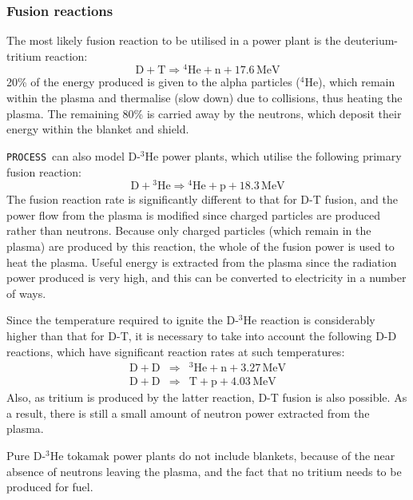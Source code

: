 \documentclass[11pt,a4paper]{report}
\newcommand{\process}{\mbox{\texttt{PROCESS}}}
\begin{document}
\subsubsection{Fusion reactions}
\label{sec:fusion_reactions}

The most likely fusion reaction to be utilised in a power plant is the
deuterium-tritium reaction:
\begin{equation}
\mathrm{D + T} \Longrightarrow \mathrm{^{4}He + n + 17.6 \,MeV}
\label{eqn:d-t}
\end{equation}
20\% of the energy produced is given to the alpha particles ($^4$He), which
remain within the plasma and thermalise (slow down) due to collisions, thus
heating the plasma. The remaining 80\% is carried away by the neutrons, which
deposit their energy within the blanket and shield.

\process\ can also model D-$^3$He power plants, which utilise the following primary
fusion reaction:
\begin{equation}
\mathrm{D + \mbox{$^3$He}} \Longrightarrow \mathrm{^{4}He + p + 18.3 \,MeV}
\label{eqn:dhe3}
\end{equation}
The fusion reaction rate is significantly different to that for D-T fusion,
and the power flow from the plasma is modified since charged particles are
produced rather than neutrons. Because only charged particles (which remain in
the plasma) are produced by this reaction, the whole of the fusion power is
used to heat the plasma. Useful energy is extracted from the plasma since the
radiation power produced is very high, and this can be converted to
electricity in a number of ways.

Since the temperature required to ignite the D-$^3$He reaction is considerably
higher than that for D-T, it is necessary to take into account the following
D-D reactions, which have significant reaction rates at such temperatures:
\begin{eqnarray}
\mathrm{D + D} & \Longrightarrow & \mathrm{^{3}He + n + 3.27 \,MeV} \\
\mathrm{D + D} & \Longrightarrow & \mathrm{T + p + 4.03 \,MeV}
\end{eqnarray}
Also, as tritium is produced by the latter reaction, D-T fusion is also
possible. As a result, there is still a small amount of neutron power
extracted from the plasma.

Pure D-$^3$He tokamak power plants do not include blankets, because of the near
absence of neutrons leaving the plasma, and the fact that no tritium needs to
be produced for fuel.
\end{document}
